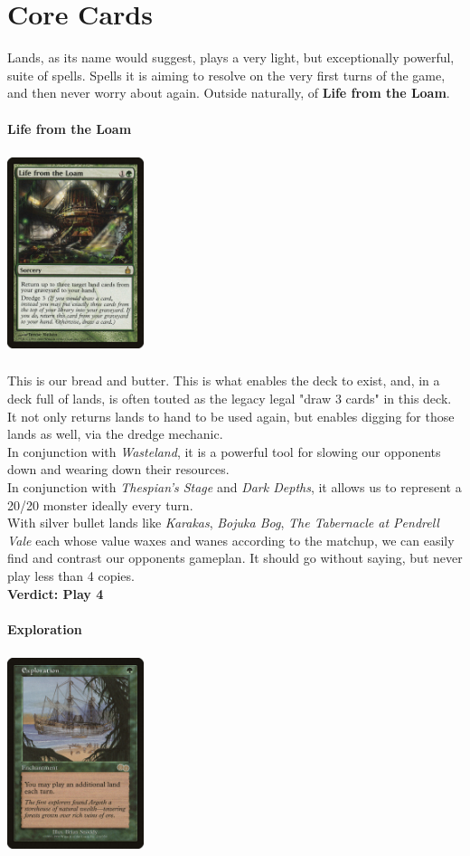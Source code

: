 \documentclass{report}
\begin{document}
\chapter{Core Cards}
Lands, as its name would suggest, plays a very light, but exceptionally powerful, suite of spells. Spells it is aiming to resolve on the very first turns of the game, and then never worry about again. Outside naturally, of \textbf{Life from the Loam}.\\\\
\textbf{Life from the Loam\\}
\begin{center}
\includegraphics [width = 4cm, height = 6cm] {life-from-the-loam}\\
\end{center}
This is our bread and butter. This is what enables the deck to exist, and, in a deck full of lands, is often touted as the legacy legal "draw 3 cards" in this deck.\\It not only returns lands to hand to be used again, but enables digging for those lands as well, via the dredge mechanic.\\In conjunction with \emph{Wasteland}, it is a powerful tool for slowing our opponents down and wearing down their resources.\\ In conjunction with \emph{Thespian's Stage} and \emph{Dark Depths}, it allows us to represent a 20/20 monster ideally every turn.\\With silver bullet lands like \emph{Karakas}, \emph{Bojuka Bog}, \emph{The Tabernacle at Pendrell Vale} each whose value waxes and wanes according to the matchup, we can easily find and contrast our opponents gameplan.
It should go without saying, but never play less than 4 copies.\\
\textbf{Verdict: Play 4\\}\\
\textbf{Exploration\\}
\begin{center}
\includegraphics [width = 4cm, height = 6cm] {exploration}\\
\end{center}
\end{document}
